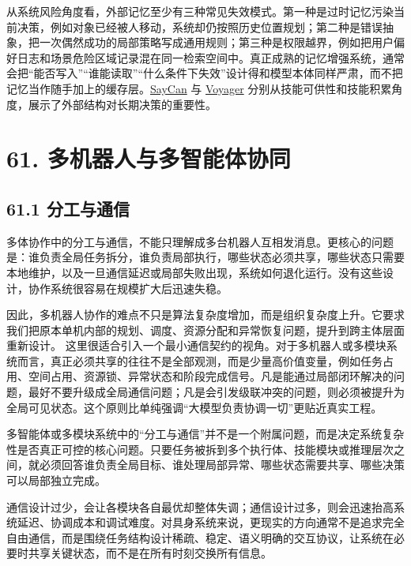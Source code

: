从系统风险角度看，外部记忆至少有三种常见失效模式。第一种是过时记忆污染当前决策，例如对象已经被人移动，系统却仍按照历史位置规划；第二种是错误抽象，把一次偶然成功的局部策略写成通用规则；第三种是权限越界，例如把用户偏好日志和场景危险区域记录混在同一检索空间中。真正成熟的记忆增强系统，通常会把“能否写入”“谁能读取”“什么条件下失效”设计得和模型本体同样严肃，而不把记忆当作随手加上的缓存层。\href{https://arxiv.org/abs/2204.01691}{SayCan} 与 \href{https://arxiv.org/abs/2305.16291}{Voyager} 分别从技能可供性和技能积累角度，展示了外部结构对长期决策的重要性。

\section*{61. 多机器人与多智能体协同}

\subsection*{61.1 分工与通信}


多体协作中的分工与通信，不能只理解成多台机器人互相发消息。更核心的问题是：谁负责全局任务拆分，谁负责局部执行，哪些状态必须共享，哪些状态只需要本地维护，以及一旦通信延迟或局部失败出现，系统如何退化运行。没有这些设计，协作系统很容易在规模扩大后迅速失稳。

因此，多机器人协作的难点不只是算法复杂度增加，而是组织复杂度上升。它要求我们把原本单机内部的规划、调度、资源分配和异常恢复问题，提升到跨主体层面重新设计。 这里很适合引入一个最小通信契约的视角。对于多机器人或多模块系统而言，真正必须共享的往往不是全部观测，而是少量高价值变量，例如任务占用、空间占用、资源锁、异常状态和阶段完成信号。凡是能通过局部闭环解决的问题，最好不要升级成全局通信问题；凡是会引发级联冲突的问题，则必须被提升为全局可见状态。这个原则比单纯强调“大模型负责协调一切”更贴近真实工程。

多智能体或多模块系统中的“分工与通信”并不是一个附属问题，而是决定系统复杂性是否真正可控的核心问题。只要任务被拆到多个执行体、技能模块或推理层次之间，就必须回答谁负责全局目标、谁处理局部异常、哪些状态需要共享、哪些决策可以局部独立完成。

通信设计过少，会让各模块各自最优却整体失调；通信设计过多，则会迅速抬高系统延迟、协调成本和调试难度。对具身系统来说，更现实的方向通常不是追求完全自由通信，而是围绕任务结构设计稀疏、稳定、语义明确的交互协议，让系统在必要时共享关键状态，而不是在所有时刻交换所有信息。

